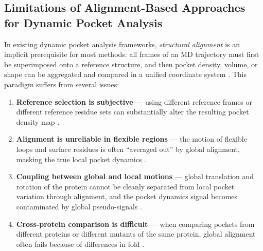 \documentclass[11pt,a4paper]{article}
\begin{document}
\subsection{Limitations of Alignment-Based Approaches for Dynamic
            Pocket Analysis}
In existing dynamic pocket analysis frameworks,
\emph{structural alignment} is an implicit prerequisite for most
methods: all frames of an MD trajectory must first be superimposed
onto a reference structure, and then pocket density, volume, or
shape can be aggregated and compared in a unified coordinate system
\citep{lindow2013exploring,parulek2013visual,zhan2020spatiotemporal}.
This paradigm suffers from several issues:
\begin{enumerate}
  \item \textbf{Reference selection is subjective} --- using
        different reference frames or different reference residue
        sets can substantially alter the resulting pocket density
        map \citep{krone2016visual}.
  \item \textbf{Alignment is unreliable in flexible regions} ---
        the motion of flexible loops and surface residues is often
        ``averaged out'' by global alignment, masking the true local
        pocket dynamics \citep{eguida2022estimating}.
  \item \textbf{Coupling between global and local motions} ---
        global translation and rotation of the protein cannot be
        cleanly separated from local pocket variation through
        alignment, and the pocket dynamics signal becomes
        contaminated by global pseudo-signals
        \citep{vant2024complex}.
  \item \textbf{Cross-protein comparison is difficult} --- when
        comparing pockets from different proteins or different
        mutants of the same protein, global alignment often fails
        because of differences in fold
        \citep{eguida2022estimating,weill2010alignment}.
\end{enumerate}
\end{document}

